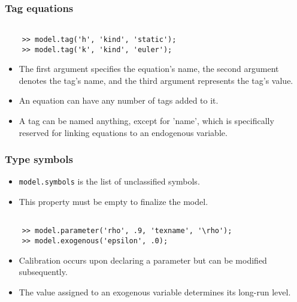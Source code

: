 \documentclass[10pt,slidestop]{beamer}
\theoremstyle{plain}
\begin{document}
\begin{frame}[c,fragile]
  \frametitle{Tag equations}

  \begin{lstlisting}[style=MatlabConsole]

    >> model.tag('h', 'kind', 'static');
    >> model.tag('k', 'kind', 'euler');
   \end{lstlisting}

   \bigskip

  \begin{itemize}

  \item The first argument specifies the equation's name, the second
    argument denotes the tag's name, and the third argument represents
    the tag's value.\newline

  \item An equation can have any number of tags added to it.\newline

  \item A tag can be named anything, except for 'name', which is
    specifically reserved for linking equations to an endogenous
    variable.\newline

  \end{itemize}

\end{frame}


\begin{frame}[c,fragile]
  \frametitle{Type symbols}

  \begin{itemize}

  \item \verb+model.symbols+ is the list of unclassified symbols.\newline

  \item This property must be empty to finalize the model.\newline

  \end{itemize}

  \begin{lstlisting}[style=MatlabConsole]

    >> model.parameter('rho', .9, 'texname', '\rho');
    >> model.exogenous('epsilon', .0);
   \end{lstlisting}

   \medskip

  \begin{itemize}

  \item Calibration occurs upon declaring a parameter but can be modified subsequently.\newline

  \item The value assigned to an exogenous variable determines its long-run level.

  \end{itemize}

\end{frame}
\end{document}
